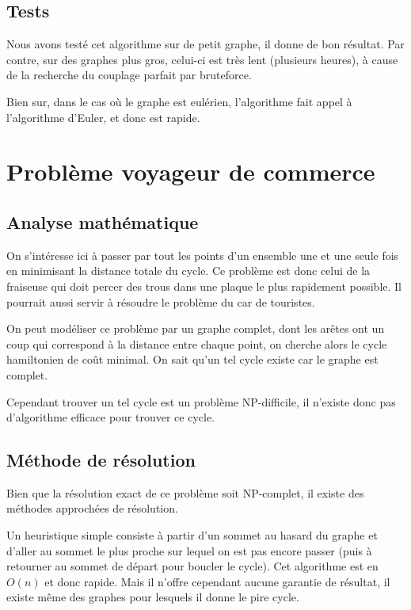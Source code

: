 \documentclass{scrartcl}
\begin{document}
  \subsection{Tests}
    Nous avons testé cet algorithme sur de petit graphe, il donne de bon
    résultat. Par contre, sur des graphes plus gros, celui-ci est très lent
    (plusieurs heures), à cause de la recherche du couplage parfait par
    bruteforce.

    Bien sur, dans le cas où le graphe est eulérien, l'algorithme fait appel
    à l'algorithme d'Euler, et donc est rapide.

\section{Problème voyageur de commerce} \label{sec:tsp}
  \subsection{Analyse mathématique}
    On s'intéresse ici à passer par tout les points d'un ensemble une et une
    seule fois en minimisant la distance totale du cycle. Ce problème est donc
    celui de la fraiseuse qui doit percer des trous dans une plaque le plus
    rapidement possible. Il pourrait aussi servir à résoudre le problème du car
    de touristes.

    On peut modéliser ce problème par un graphe complet, dont les arêtes ont un
    coup qui correspond à la distance entre chaque point, on cherche alors le
    cycle hamiltonien de coût minimal. On sait qu'un tel cycle existe car le
    graphe est complet.

    Cependant trouver un tel cycle est un problème NP-difficile, il n'existe
    donc pas d'algorithme efficace pour trouver ce cycle.

  \subsection{Méthode de résolution}
    Bien que la résolution exact de ce problème soit NP-complet, il existe des
    méthodes approchées de résolution.

    Un heuristique simple consiste à partir d'un sommet au hasard du graphe et
    d'aller au sommet le plus proche sur lequel on est pas encore passer (puis
    à retourner au sommet de départ pour boucler le cycle). Cet algorithme est
    en $O(n)$ et donc rapide. Mais il n'offre cependant aucune garantie de
    résultat, il existe même des graphes pour lesquels il donne le pire cycle.
\end{document}
